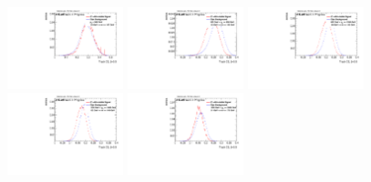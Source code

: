 \begin{figure}[H]
\includegraphics[width=0.3\textwidth]{sascha_input/Appendix/Distributions/higgs/distributions/beta05/h_normal_tj_C2_05_bin1.pdf} 	\hspace{1mm}
\includegraphics[width=0.3\textwidth]{sascha_input/Appendix/Distributions/higgs/distributions/beta05/h_normal_tj_C2_05_bin2.pdf} 	\hspace{4mm}
\includegraphics[width=0.3\textwidth]{sascha_input/Appendix/Distributions/higgs/distributions/beta05/h_normal_tj_C2_05_bin3.pdf} 
\bigskip
\includegraphics[width=0.3\textwidth]{sascha_input/Appendix/Distributions/higgs/distributions/beta05/h_normal_tj_C2_05_bin4.pdf} 	\hspace{4mm}
\includegraphics[width=0.3\textwidth]{sascha_input/Appendix/Distributions/higgs/distributions/beta05/h_normal_tj_C2_05_bin5.pdf} 


\end{figure}

